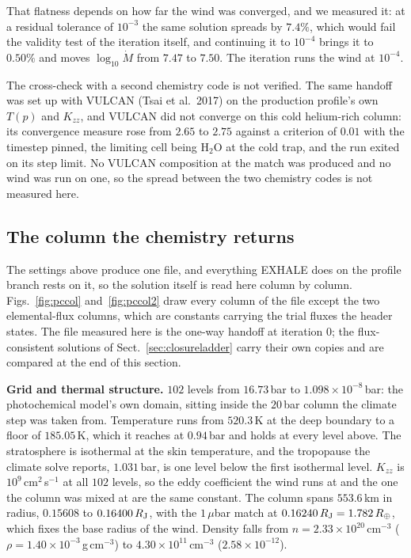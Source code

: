 \documentclass[english,a4paper]{my_memo}
\begin{document}
That flatness depends on how far the wind was converged, and we measured it:
at a residual tolerance of $10^{-3}$ the same solution spreads by $7.4\%$,
which would fail the validity test of the iteration itself, and continuing it
to $10^{-4}$ brings it to $0.50\%$ and moves $\log_{10}\dot M$ from $7.47$ to
$7.50$. The iteration runs the wind at $10^{-4}$.

\medskip
\noindent The cross-check with a second chemistry code is not verified. The
same handoff was set up with VULCAN (Tsai et al.\ 2017) on the production
profile's own $T(p)$ and $K_{zz}$, and VULCAN did not converge on this cold
helium-rich column: its convergence measure rose from $2.65$ to $2.75$
against a criterion of $0.01$ with the timestep pinned, the limiting cell
being H$_2$O at the cold trap, and the run exited on its step limit. No
VULCAN composition at the match was produced and no wind was run on one, so
the spread between the two chemistry codes is not measured here.

\subsection{The column the chemistry returns}
\label{sec:photochem}

The settings above produce one file, and everything EXHALE does on the
profile branch rests on it, so the solution itself is read here column by
column. Figs.~\ref{fig:pccol} and~\ref{fig:pccol2} draw every column of the
file except the two elemental-flux columns, which are constants carrying the
trial fluxes the header states. The file measured here is the one-way handoff
at iteration $0$; the flux-consistent solutions of
Sect.~\ref{sec:closureladder} carry their own copies and are compared at the
end of this section.

\medskip
\noindent\textbf{Grid and thermal structure.} $102$ levels from $16.73$\,bar
to $1.098\times10^{-8}$\,bar: the photochemical model's own domain, sitting
inside the $20$\,bar column the climate step was taken from. Temperature runs
from $520.3$\,K at the deep boundary to a floor of $185.05$\,K, which it
reaches at $0.94$\,bar and holds at every level above. The stratosphere is
isothermal at the skin temperature, and the tropopause the climate solve
reports, $1.031$\,bar, is one level below the first isothermal level.
$K_{zz}$ is $10^{9}$\,cm$^2$\,s$^{-1}$ at all $102$ levels, so the eddy
coefficient the wind runs at and the one the column was mixed at are the same
constant. The column spans $553.6$\,km in radius, $0.15608$ to
$0.16400\,R_{\rm J}$, with the $1\,\mu$bar match at
$0.16240\,R_{\rm J} = 1.782\,R_\oplus$, which fixes the base radius of the
wind. Density falls from $n = 2.33\times10^{20}$\,cm$^{-3}$
($\rho = 1.40\times10^{-3}$\,g\,cm$^{-3}$) to
$4.30\times10^{11}$\,cm$^{-3}$ ($2.58\times10^{-12}$).
\end{document}
